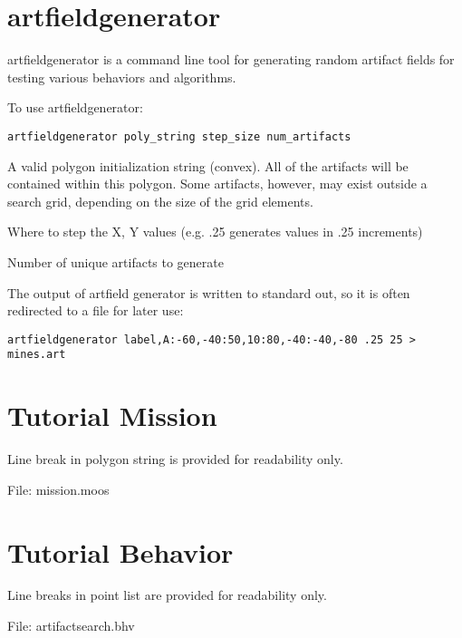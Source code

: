 \section{artfieldgenerator}
\label{app:artfieldgenerator}
artfieldgenerator is a command line tool for generating random artifact fields for testing various behaviors and algorithms.

To use artfieldgenerator:

\scriptsize
{\tt artfieldgenerator poly\_string step\_size num\_artifacts}
\normalsize

\begin{hangpar}{\pin}{}
A valid polygon initialization string (convex).  All of the artifacts will be contained within this polygon.  Some artifacts, however, may exist outside a search grid, depending on the size of the grid elements.
\end{hangpar}

\begin{hangpar}{\pin}{}
Where to step the X, Y values (e.g. .25 generates values in .25 increments)
\end{hangpar}

\begin{hangpar}{\pin}{}
Number of unique artifacts to generate
\end{hangpar}

The output of artfield generator is written to standard out, so it is often redirected to a file for later use:

\scriptsize
{\tt artfieldgenerator label,A:-60,-40:50,10:80,-40:-40,-80 .25 25 > mines.art}
\normalsize

\section{Tutorial Mission}
\label{app:tutorialmission}
Line break in polygon string is provided for readability only.

File: mission.moos
\scriptsize

\normalsize

\section{Tutorial Behavior}
\label{app:tutorialbehavior}
Line breaks in point list are provided for readability only.

File: artifactsearch.bhv
\scriptsize

\normalsize
